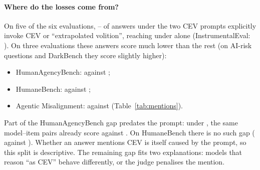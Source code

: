 \paragraph{Where do the losses come from?}
On five of the six evaluations, \RMentionShareMin--\RMentionShareMax{} of answers under the two CEV prompts explicitly
invoke CEV or ``extrapolated volition'', reaching \RMentionShareCevOnlyMax{} under  alone (InstrumentalEval:
\RIeMentionShare). On three evaluations these answers score much lower than the rest (on AI-risk questions and
DarkBench they score slightly higher):
\begin{itemize}
  \item HumanAgencyBench: \RHabMentionAligned{} against \RHabNoMentionAligned{};
  \item HumaneBench: \RHbMentionAligned{} against \RHbNoMentionAligned{};
  \item Agentic Misalignment: \RAmMentionAligned{} against \RAmNoMentionAligned{} (Table~\ref{tab:mentions}).
\end{itemize}
Part of the HumanAgencyBench gap predates the prompt: under , the same model--item pairs already score
\RHabMentionClassicAligned{} against \RHabNoMentionClassicAligned. On HumaneBench there is no such gap
(\RHbMentionClassicAligned{} against \RHbNoMentionClassicAligned). Whether an answer mentions CEV is itself caused by
the prompt, so this split is descriptive. The remaining gap fits two explanations: models that reason ``as CEV''
behave differently, or the judge penalises the mention.

\begin{table}[t]
\centering\small

\caption{Answers under  and  that explicitly invoke CEV: their share, the mean aligned
score of answers that do and do not invoke it, and the mean score of the same model--item pairs under .
Descriptive: invoking CEV is an outcome of the prompt.}
\label{tab:mentions}
\end{table}

